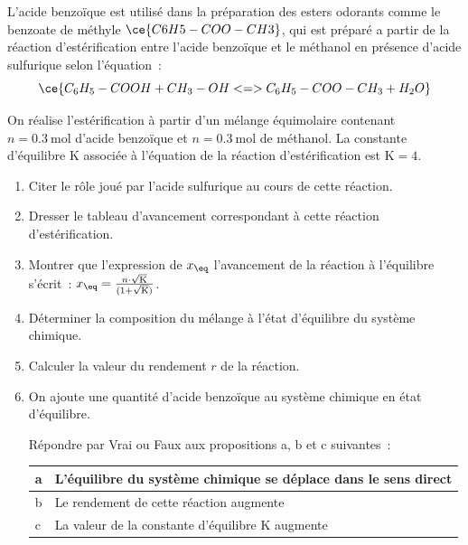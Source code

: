 L'acide benzoïque est utilisé dans la préparation des esters odorants comme le
benzoate de méthyle $\ce{C6H5-COO-CH3}$, qui est préparé a partir de la
réaction d'estérification entre l'acide benzoïque et le méthanol en présence
d'acide sulfurique selon l'équation~:
\[
    \ce{C_6H_5-COOH + CH_3-OH <=> C_6H_5-COO-CH_3 + H_2O}
\]

On réalise l'estérification à partir d'un mélange équimolaire contenant
$n=\qty{0,3}{\mole}$ d'acide benzoïque et $n=\qty{0,3}{\mole}$ de méthanol. La
constante d'équilibre $\mathrm{K}$ associée à l'équation de la réaction
d'estérification est $\mathrm{K}=4$. 
\begin{enumerate}
    \item Citer le rôle joué par l'acide sulfurique au cours de cette réaction.
    \item Dresser le tableau d'avancement correspondant à cette réaction
          d'estérification.
    \item Montrer que l'expression de $x_{\eq}$ l'avancement de la réaction à
          l'équilibre s'écrit~:
          $x_{\eq}=\frac{n\cdot\sqrt{\mathrm{K}}}{(1+\sqrt{\mathrm{K}})}$.
    \item Déterminer la composition du mélange à l'état d'équilibre du système
          chimique.
    \item Calculer la valeur du rendement $r$ de la réaction.
    \item On ajoute une quantité d'acide benzoïque au système chimique en état
          d'équilibre.

          Répondre par Vrai ou Faux aux propositions a, b et c suivantes~:
          \begin{table}[H]
              \centering
              \renewcommand{\arraystretch}{1.5}
              \begin{tabularx}{0.8\textwidth}{|
                    >{\arraybackslash\centering}p{6mm}|L|}
                  \hline a & L'équilibre du système chimique se déplace dans le
                             sens direct \\
                  \hline b & Le rendement de cette réaction augmente \\
                  \hline c & La valeur de la constante d'équilibre $\mathrm{K}$
                             augmente \\
                  \hline
              \end{tabularx}
          \end{table}
\end{enumerate}

